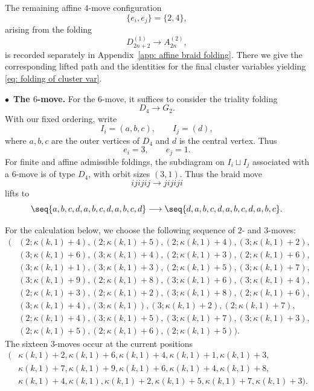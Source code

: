 \documentclass[12pt, leqno]{amsart}
\numberwithin{equation}{section}
\theoremstyle{plain}
\theoremstyle{definition}
\begin{document}
The remaining affine $4$-move configuration
\[
  \{e_i,e_j\}=\{2,4\},
\]
arising from the folding
\[
  D_{2n+2}^{(1)}\longrightarrow A_{2n}^{(2)},
\]
is recorded separately in Appendix~\ref{app: affine braid folding}.
There we give the corresponding lifted path and the identities for the final cluster variables yielding \eqref{eq: folding of cluster var}.

\medskip
\noindent
$\bullet$\ \textbf{The $6$-move.}
 For the $6$-move, it suffices to consider the triality folding
\[
D_4\longrightarrow G_2.
\]
With our fixed ordering, write
\[
I_i=(a,b,c),\qquad I_j=(d),
\]
where $a,b,c$ are the outer vertices of $D_4$ and $d$ is the central
vertex. Thus
\[
e_i=3,\qquad e_j=1.
\]
 For finite and affine admissible foldings, the subdiagram on
$I_i\sqcup I_j$ associated with a $6$-move is of type $D_4$,
with orbit sizes $(3,1)$. 
Thus the braid move
\[
ijijij\longrightarrow jijiji
\]
lifts to
\[
\seq{a,b,c,d,a,b,c,d,a,b,c,d}
\longrightarrow
\seq{d,a,b,c,d,a,b,c,d,a,b,c}.
\]

For  the calculation below, we choose the following sequence of $2$- and $3$-moves:{}
\begin{equation}\label{eq: seq of lifted 6-move 3,1}
\begin{aligned}
\boldsymbol{(}&(2;\kappa(k,1)+4),(2;\kappa(k,1)+5),
(2;\kappa(k,1)+4),(3;\kappa(k,1)+2),\\
&(3;\kappa(k,1)+6),(3;\kappa(k,1)+4),
(2;\kappa(k,1)+3),(2;\kappa(k,1)+6),\\
&(3;\kappa(k,1)+1),(3;\kappa(k,1)+3),
(2;\kappa(k,1)+5),(3;\kappa(k,1)+7),\\
&(3;\kappa(k,1)+9),(2;\kappa(k,1)+8),
(3;\kappa(k,1)+6),(3;\kappa(k,1)+4),\\
&(2;\kappa(k,1)+3),(2;\kappa(k,1)+2),
(3;\kappa(k,1)+8),(2;\kappa(k,1)+6),\\
&(3;\kappa(k,1)+4),(3;\kappa(k,1)),
(3;\kappa(k,1)+2),(2;\kappa(k,1)+7),\\
&(2;\kappa(k,1)+4),(3;\kappa(k,1)+5),
(3;\kappa(k,1)+7),(3;\kappa(k,1)+3),\\
&(2;\kappa(k,1)+5),(2;\kappa(k,1)+6),
(2;\kappa(k,1)+5)\boldsymbol{)}.
\end{aligned}
\end{equation}
The sixteen $3$-moves occur at the current positions
\begin{align*}
\boldsymbol{(} & \kappa(k,1)+2,\kappa(k,1)+6,\kappa(k,1)+4,
\kappa(k,1)+1,\kappa(k,1)+3,\\
& \kappa(k,1)+7,\kappa(k,1)+9,\kappa(k,1)+6,
\kappa(k,1)+4,\kappa(k,1)+8,\\
& \kappa(k,1)+4,\kappa(k,1),\kappa(k,1)+2,
\kappa(k,1)+5,\kappa(k,1)+7,\kappa(k,1)+3\boldsymbol{)}.
\end{align*}
\end{document}
